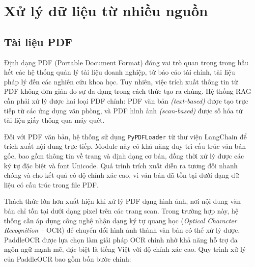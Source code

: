 \section{Xử lý dữ liệu từ nhiều nguồn}

\subsection{Tài liệu PDF}

Định dạng PDF {(Portable Document Format)} đóng vai trò quan trọng trong hầu hết các hệ thống quản lý tài liệu doanh nghiệp, từ báo cáo tài chính, tài liệu pháp lý đến các nghiên cứu khoa học. Tuy nhiên, việc trích xuất thông tin từ PDF không đơn giản do sự đa dạng trong cách thức tạo ra chúng. Hệ thống RAG cần phải xử lý được hai loại PDF chính: PDF văn bản \emph{(text-based)} được tạo trực tiếp từ các ứng dụng văn phòng, và PDF hình ảnh \emph{(scan-based)} được số hóa từ tài liệu giấy thông qua máy quét.

Đối với PDF văn bản, hệ thống sử dụng \texttt{PyPDFLoader} từ thư viện LangChain để trích xuất nội dung trực tiếp. Module này có khả năng duy trì cấu trúc văn bản gốc, bao gồm thông tin về trang và định dạng cơ bản, đồng thời xử lý được các ký tự đặc biệt và font Unicode. Quá trình trích xuất diễn ra tương đối nhanh chóng và cho kết quả có độ chính xác cao, vì văn bản đã tồn tại dưới dạng dữ liệu có cấu trúc trong file PDF.

Thách thức lớn hơn xuất hiện khi xử lý PDF dạng hình ảnh, nơi nội dung văn bản chỉ tồn tại dưới dạng pixel trên các trang scan. Trong trường hợp này, hệ thống cần áp dụng công nghệ {nhận dạng ký tự quang học} (\emph{Optical Character Recognition} -- OCR) để chuyển đổi hình ảnh thành văn bản có thể xử lý được. PaddleOCR được lựa chọn làm giải pháp OCR chính nhờ khả năng hỗ trợ đa ngôn ngữ mạnh mẽ, đặc biệt là tiếng Việt với độ chính xác cao. Quy trình xử lý của PaddleOCR bao gồm bốn bước chính:


